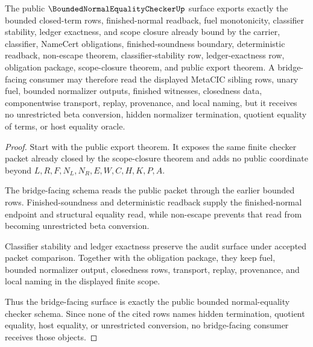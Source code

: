 \begin{theorem}
\label{thm:bounded-normal-equality-checker-bridge-facing-schema}
The public $\BoundedNormalEqualityCheckerUp$ surface exports exactly the bounded closed-term rows, finished-normal readback, fuel monotonicity, classifier stability, ledger exactness, and scope closure already bound by the carrier, classifier, NameCert obligations, finished-soundness boundary, deterministic readback, non-escape theorem, classifier-stability row, ledger-exactness row, obligation package, scope-closure theorem, and public export theorem. A bridge-facing consumer may therefore read the displayed MetaCIC sibling rows, unary fuel, bounded normalizer outputs, finished witnesses, closedness data, componentwise transport, replay, provenance, and local naming, but it receives no unrestricted beta conversion, hidden normalizer termination, quotient equality of terms, or host equality oracle.
\end{theorem}
\begin{proof}
Start with the public export theorem. It exposes the same finite checker packet already closed by the scope-closure theorem and adds no public coordinate beyond $L,R,F,N_L,N_R,E,W,C,H,K,P,A$.

The bridge-facing schema reads the public packet through the earlier bounded rows. Finished-soundness and deterministic readback supply the finished-normal endpoint and structural equality read, while non-escape prevents that read from becoming unrestricted beta conversion.

Classifier stability and ledger exactness preserve the audit surface under accepted packet comparison. Together with the obligation package, they keep fuel, bounded normalizer output, closedness rows, transport, replay, provenance, and local naming in the displayed finite scope.

Thus the bridge-facing surface is exactly the public bounded normal-equality checker schema. Since none of the cited rows names hidden termination, quotient equality, host equality, or unrestricted conversion, no bridge-facing consumer receives those objects.
\end{proof}


